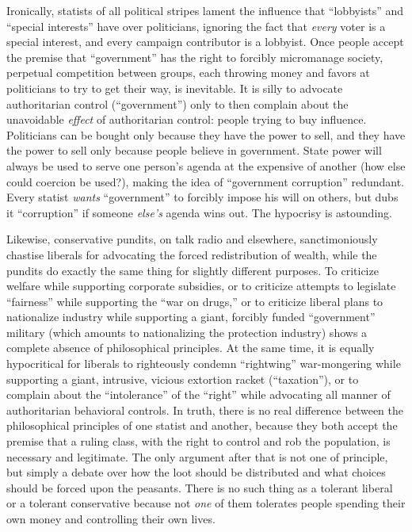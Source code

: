 \documentclass{book}
\begin{document}
Ironically, statists of all political stripes lament the influence that \enquote{lobbyists} and \enquote{special interests} have over politicians, ignoring the fact that \emph{every} voter is a special interest, and every campaign contributor is a lobbyist. Once people accept the premise that \enquote{government} has the right to forcibly micromanage society, perpetual competition between groups, each throwing money and favors at politicians to try to get their way, is inevitable. It is silly to advocate authoritarian control (\enquote{government}) only to then complain about the unavoidable \emph{effect} of authoritarian control: people trying to buy influence. Politicians can be bought only because they have the power to sell, and they have the power to sell only because people believe in government. State power will always be used to serve one person's agenda at the expensive of another (how else could coercion be used?), making the idea of \enquote{government corruption} redundant. Every statist \emph{wants} \enquote{government} to forcibly impose his will on others, but dubs it \enquote{corruption} if someone \emph{else's} agenda wins out. The hypocrisy is astounding.

Likewise, conservative pundits, on talk radio and elsewhere, sanctimoniously chastise liberals for advocating the forced redistribution of wealth, while the pundits do exactly the same thing for slightly different purposes. To criticize welfare while supporting corporate subsidies, or to criticize attempts to legislate \enquote{fairness} while supporting the \enquote{war on drugs,} or to criticize liberal plans to nationalize industry while supporting a giant, forcibly funded \enquote{government} military (which amounts to nationalizing the protection industry) shows a complete absence of philosophical principles. At the same time, it is equally hypocritical for liberals to righteously condemn \enquote{rightwing} war-mongering while supporting a giant, intrusive, vicious extortion racket (\enquote{taxation}), or to complain about the \enquote{intolerance} of the \enquote{right} while advocating all manner of authoritarian behavioral controls. In truth, there is no real difference between the philosophical principles of one statist and another, because they both accept the premise that a ruling class, with the right to control and rob the population, is necessary and legitimate. The only argument after that is not one of principle, but simply a debate over how the loot should be distributed and what choices should be forced upon the peasants. There is no such thing as a tolerant liberal or a tolerant conservative because not \emph{one} of them tolerates people spending their own money and controlling their own lives.
\end{document}
